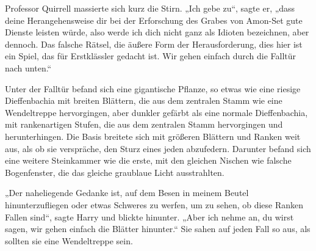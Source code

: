Professor Quirrell massierte sich kurz die Stirn.
„Ich gebe zu“, sagte er, „dass deine Herangehensweise dir bei der Erforschung des Grabes von Amon-Set gute Dienste leisten würde, also werde ich dich nicht ganz als Idioten bezeichnen, aber dennoch. Das falsche Rätsel, die äußere Form der Herausforderung, dies hier ist ein Spiel, das für Erstklässler gedacht ist. Wir gehen einfach durch die Falltür nach unten.“

Unter der Falltür befand sich eine gigantische Pflanze, so etwas wie eine riesige Dieffenbachia mit breiten Blättern, die aus dem zentralen Stamm wie eine Wendeltreppe hervorgingen, aber dunkler gefärbt als eine normale Dieffenbachia, mit rankenartigen Stufen, die aus dem zentralen Stamm hervorgingen und herunterhingen. Die Basis breitete sich mit größeren Blättern und Ranken weit aus, als ob sie verspräche, den Sturz eines jeden abzufedern. Darunter befand sich eine weitere Steinkammer wie die erste, mit den gleichen Nischen wie falsche Bogenfenster, die das gleiche graublaue Licht ausstrahlten.

„Der naheliegende Gedanke ist, auf dem Besen in meinem Beutel hinunterzufliegen oder etwas Schweres zu werfen, um zu sehen, ob diese Ranken Fallen sind“, sagte Harry und blickte hinunter. „Aber ich nehme an, du wirst sagen, wir gehen einfach die Blätter hinunter.“
Sie sahen auf jeden Fall so aus, als sollten sie eine Wendeltreppe sein.


